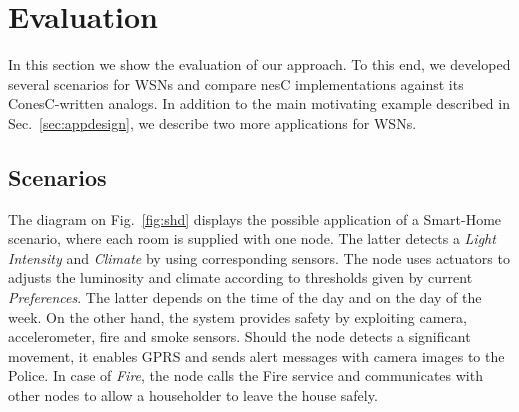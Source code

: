 \section{Evaluation}\label{sec:eval}

In this section we show the evaluation of our approach. To this end, we
developed several scenarios for WSNs and compare nesC implementations against
its ConesC-written analogs. In addition to the main motivating example described
in Sec.~\ref{sec:appdesign}, we describe two more applications for WSNs.

\subsection{Scenarios}\label{sec:scenarios}

The diagram on Fig.~\ref{fig:shd} displays the possible application of a
Smart-Home scenario, where each room is supplied with one node. The latter
detects a \emph{Light Intensity} and \emph{Climate} by using corresponding
sensors. The node uses actuators to adjusts the luminosity and climate according
to thresholds given by current \emph{Preferences}. The latter depends on the
time of the day and on the day of the week. On the other hand, the system
provides safety by exploiting camera, accelerometer, fire and smoke sensors.
Should the node detects a significant movement, it enables GPRS and sends alert
messages with camera images to the Police. In case of \emph{Fire}, the node
calls the Fire service and communicates with other nodes to allow a householder
to leave the house safely.


